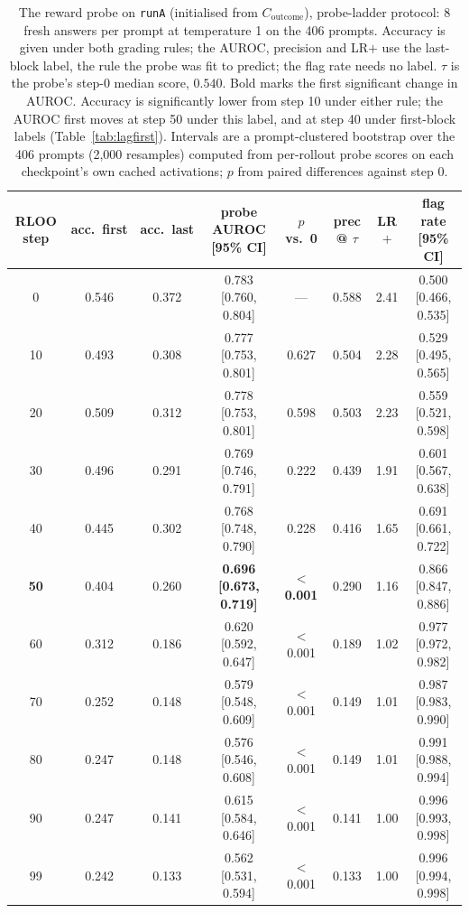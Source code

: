 \documentclass{article}
\begin{document}
\begin{table}[t]
\centering
\footnotesize
\setlength{\tabcolsep}{3.2pt}
\renewcommand{\arraystretch}{0.92}
\begin{tabular}{cccccccc}
\toprule
RLOO step & acc.\ first & acc.\ last & \textbf{probe AUROC} [95\% CI] & $p$ vs.\ 0 & prec @ $\tau$ & \textbf{LR}$+$ & \textbf{flag rate} [95\% CI] \\
\midrule
0  & 0.546 & 0.372 & 0.783 [0.760, 0.804] & --- & 0.588 & 2.41 & 0.500 [0.466, 0.535] \\
10 & 0.493 & 0.308 & 0.777 [0.753, 0.801] & 0.627 & 0.504 & 2.28 & 0.529 [0.495, 0.565] \\
20 & 0.509 & 0.312 & 0.778 [0.753, 0.801] & 0.598 & 0.503 & 2.23 & 0.559 [0.521, 0.598] \\
30 & 0.496 & 0.291 & 0.769 [0.746, 0.791] & 0.222 & 0.439 & 1.91 & 0.601 [0.567, 0.638] \\
40 & 0.445 & 0.302 & 0.768 [0.748, 0.790] & 0.228 & 0.416 & 1.65 & 0.691 [0.661, 0.722] \\
\textbf{50} & 0.404 & 0.260 & \textbf{0.696 [0.673, 0.719]} & \textbf{$<$0.001} & 0.290 & 1.16 & 0.866 [0.847, 0.886] \\
60 & 0.312 & 0.186 & 0.620 [0.592, 0.647] & $<$0.001 & 0.189 & 1.02 & 0.977 [0.972, 0.982] \\
70 & 0.252 & 0.148 & 0.579 [0.548, 0.609] & $<$0.001 & 0.149 & 1.01 & 0.987 [0.983, 0.990] \\
80 & 0.247 & 0.148 & 0.576 [0.546, 0.608] & $<$0.001 & 0.149 & 1.01 & 0.991 [0.988, 0.994] \\
90 & 0.247 & 0.141 & 0.615 [0.584, 0.646] & $<$0.001 & 0.141 & 1.00 & 0.996 [0.993, 0.998] \\
99 & 0.242 & 0.133 & 0.562 [0.531, 0.594] & $<$0.001 & 0.133 & 1.00 & 0.996 [0.994, 0.998] \\
\bottomrule
\end{tabular}
\caption{The reward probe on \texttt{runA} (initialised from $C_{\text{outcome}}$), probe-ladder protocol: 8 fresh answers per prompt at temperature 1 on the 406 prompts. Accuracy is given under both grading rules; the AUROC, precision and LR$+$ use the last-block label, the rule the probe was fit to predict; the flag rate needs no label. $\tau$ is the probe's step-0 median score, $0.540$. Bold marks the first significant change in AUROC. Accuracy is significantly lower from step 10 under either rule; the AUROC first moves at step 50 under this label, and at step 40 under first-block labels (Table~\ref{tab:lagfirst}). Intervals are a prompt-clustered bootstrap over the 406 prompts (2{,}000 resamples) computed from per-rollout probe scores on each checkpoint's own cached activations; $p$ from paired differences against step 0.}\label{tab:lag}
\end{table}
\end{document}
